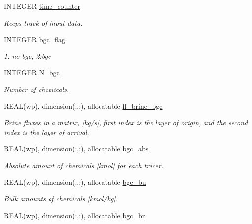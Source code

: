 \begin{DoxyCompactItemize}
INTEGER \hyperlink{namespacemo__data_acabfab1b812c7dd4f73b2ec6b059cae1}{time\_\-counter}
\begin{DoxyCompactList}\small\item\em Keeps track of input data. \item\end{DoxyCompactList}\item 
INTEGER \hyperlink{namespacemo__data_a962bc540d1c63b9ff3b571c91133070b}{bgc\_\-flag}
\begin{DoxyCompactList}\small\item\em 1: no bgc, 2:bgc \item\end{DoxyCompactList}\item 
INTEGER \hyperlink{namespacemo__data_a25de952ac1cfddcf1328f99e9e490ed3}{N\_\-bgc}
\begin{DoxyCompactList}\small\item\em Number of chemicals. \item\end{DoxyCompactList}\item 
REAL(wp), dimension(:,:), allocatable \hyperlink{namespacemo__data_a5fbc3eddb21dfefcbd20b3f95b2e9808}{fl\_\-brine\_\-bgc}
\begin{DoxyCompactList}\small\item\em Brine fluxes in a matrix, \mbox{[}kg/s\mbox{]}, first index is the layer of origin, and the second index is the layer of arrival. \item\end{DoxyCompactList}\item 
REAL(wp), dimension(:,:), allocatable \hyperlink{namespacemo__data_a0f5cfd95b789313c0a78a9b7feae167a}{bgc\_\-abs}
\begin{DoxyCompactList}\small\item\em Absolute amount of chemicals \mbox{[}kmol\mbox{]} for each tracer. \item\end{DoxyCompactList}\item 
REAL(wp), dimension(:,:), allocatable \hyperlink{namespacemo__data_a92107cbfdb8869916b149d942db53cad}{bgc\_\-bu}
\begin{DoxyCompactList}\small\item\em Bulk amounts of chemicals \mbox{[}kmol/kg\mbox{]}. \item\end{DoxyCompactList}\item 
REAL(wp), dimension(:,:), allocatable \hyperlink{namespacemo__data_a8c950715d79f982020fbc43ec03a02e8}{bgc\_\-br}

\end{DoxyCompactItemize}
